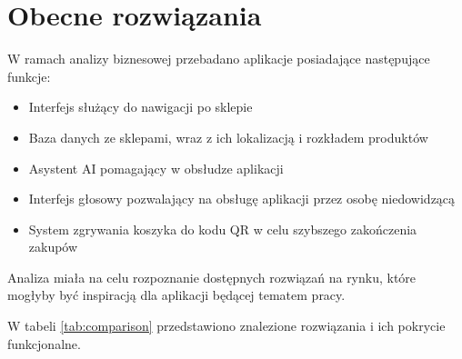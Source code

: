 \section{Obecne rozwiązania}
\label{subsec:obecne_rozwiazania}

W ramach analizy biznesowej przebadano aplikacje posiadające następujące funkcje:

\begin{itemize}
    \item Interfejs służący do nawigacji po sklepie
    \item Baza danych ze sklepami, wraz z ich lokalizacją i rozkładem produktów
    \item Asystent AI pomagający w obsłudze aplikacji
    \item Interfejs głosowy pozwalający na obsługę aplikacji przez osobę niedowidzącą
    \item System zgrywania koszyka do kodu QR w celu szybszego zakończenia zakupów
\end{itemize}
Analiza miała na celu rozpoznanie dostępnych rozwiązań na rynku, które mogłyby być inspiracją dla aplikacji będącej tematem pracy.


W tabeli \ref{tab:comparison} przedstawiono znalezione rozwiązania i ich pokrycie funkcjonalne.


